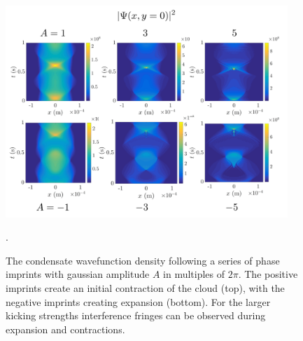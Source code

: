 \begin{figure}\centering
    \includegraphics[width=0.95\textwidth]{Images/ch4_vtx/gaussian_imprint_A}
    \caption{The condensate wavefunction density following a series of phase imprints with gaussian amplitude $A$ in multiples of $2\pi$. The positive imprints create an initial contraction of the cloud (top), with the negative imprints creating expansion (bottom). For the larger kicking strengths interference fringes can be observed during expansion and contractions.}.\label{fig:gaussian_wfc}
\end{figure}

